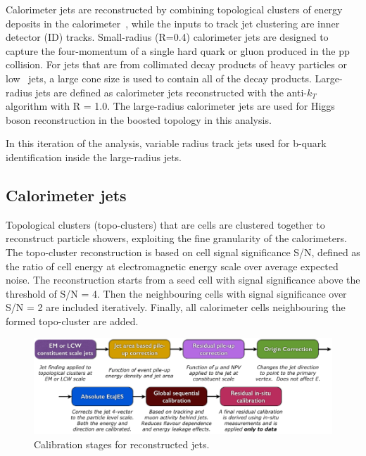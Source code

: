 \par Calorimeter jets are reconstructed by combining topological clusters of energy deposits in the calorimeter~\cite{Aad:2011he}, while the inputs to track jet clustering are inner detector (ID) tracks. 
Small-radius (R=0.4) calorimeter jets are designed to capture the four-momentum of a single hard quark or gluon produced in the pp collision. For jets that are from collimated decay products of heavy particles or low \pt~jets, 
a large cone size is used to contain all of the decay products. Large-radius jets are defined as calorimeter jets reconstructed with the anti-$k_T$ algorithm with R = 1.0. 
The large-radius calorimeter jets are used for Higgs boson reconstruction in the boosted topology in this analysis.

\par In this iteration of the analysis, variable radius track jets used for b-quark identification inside the large-radius jets.

\subsection{Calorimeter jets}
\label{sec:calo}

\par Topological clusters (topo-clusters) that are cells are clustered together to reconstruct particle showers, exploiting the fine granularity of the calorimeters. 
The topo-cluster reconstruction is based on cell signal significance S/N, defined as the ratio of cell energy at electromagnetic energy scale over average expected noise. 
The reconstruction starts from a seed cell with signal significance above the threshold of S/N = 4. Then the neighbouring cells with signal significance over S/N = 2 are included iteratively. 
Finally, all calorimeter cells neighbouring the formed topo-cluster are added.

\begin{figure}[htbp]
    \centering
    \includegraphics[width=1\textwidth]{chapters/c5/figures/jet_calib}
    \caption{Calibration stages for reconstructed jets.}
    \label{fig:jet-calib}
\end{figure}


